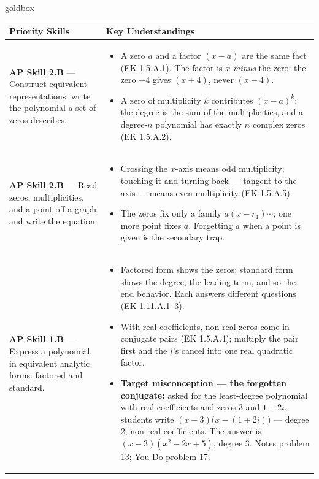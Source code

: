 \documentclass[10pt]{article}
\begin{document}
\renewcommand{\arraystretch}{1.6}
\begin{skillbox}{goldbox}
\begin{tabularx}{\linewidth}{@{}X X@{}}
\textbf{Priority Skills} &
\textbf{Key Understandings} \\
\midrule
\textbf{AP Skill 2.B} --- Construct equivalent representations: write the polynomial a set of
zeros describes. &
\begin{itemize}[leftmargin=1.2em,itemsep=2pt,topsep=0pt]
  \item A zero $a$ and a factor $(x - a)$ are the same fact (EK 1.5.A.1). The factor is $x$
        \emph{minus} the zero: the zero $-4$ gives $(x + 4)$, never $(x - 4)$.
  \item A zero of multiplicity $k$ contributes $(x - a)^k$; the degree is the sum of the
        multiplicities, and a degree-$n$ polynomial has exactly $n$ complex zeros
        (EK 1.5.A.2).
\end{itemize} \\
\textbf{AP Skill 2.B} --- Read zeros, multiplicities, and a point off a graph and write the
equation. &
\begin{itemize}[leftmargin=1.2em,itemsep=2pt,topsep=0pt]
  \item Crossing the $x$-axis means odd multiplicity; touching it and turning back --- tangent
        to the axis --- means even multiplicity (EK 1.5.A.5).
  \item The zeros fix only a family $a(x - r_1)\cdots$; one more point fixes $a$. Forgetting
        $a$ when a point is given is the secondary trap.
\end{itemize} \\
\textbf{AP Skill 1.B} --- Express a polynomial in equivalent analytic forms: factored and
standard. &
\begin{itemize}[leftmargin=1.2em,itemsep=2pt,topsep=0pt]
  \item Factored form shows the zeros; standard form shows the degree, the leading term, and
        so the end behavior. Each answers different questions (EK 1.11.A.1--3).
  \item With real coefficients, non-real zeros come in conjugate pairs (EK 1.5.A.4); multiply
        the pair first and the $i$'s cancel into one real quadratic factor.
  \item \textbf{Target misconception --- the forgotten conjugate:} asked for the least-degree
        polynomial with real coefficients and zeros $3$ and $1 + 2i$, students write
        $(x - 3)\bigl(x - (1 + 2i)\bigr)$ --- degree 2, non-real coefficients. The answer is
        $(x - 3)(x^2 - 2x + 5)$, degree 3. Notes problem 13; You Do problem 17.
\end{itemize} \\
\end{tabularx}
\end{skillbox}
\end{document}
